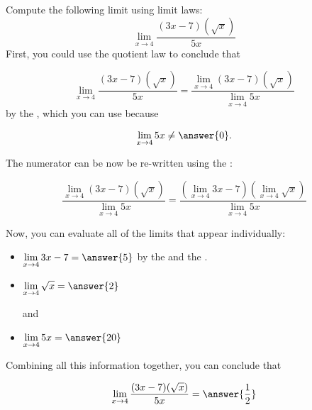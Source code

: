 \documentclass[handout]{ximera}
\begin{document}
\begin{exercise}

Compute the following limit using limit laws:
  \[
  \displaystyle\lim_{x\to 4} \frac{(3x-7)(\sqrt{x})}{5x}  \]
First, you could use the quotient law to conclude that 

\[
  \displaystyle\lim_{x\to 4} \frac{(3x-7)(\sqrt{x})}{5x} = \frac{\displaystyle\lim_{x\to 4} (3x-7)(\sqrt{x})}{\displaystyle\lim_{x\to 4} 5x} \]
by the , which you can use because 

\[
  \displaystyle\lim_{x\to 4} 5x \neq \answer{0}. \]
  
The numerator can be now be re-written using the : 

\[ \frac{\displaystyle\lim_{x\to 4} (3x-7)(\sqrt{x})}{\displaystyle\lim_{x\to 4} 5x} = \frac{\left(\displaystyle\lim_{x\to 4} 3x-7 \right) \left(\displaystyle\lim_{x\to 4}\sqrt{x}\right)}{\displaystyle\lim_{x\to 4} 5x} \]

Now, you can evaluate all of the limits that appear individually: 

\begin{itemize}

\item $\displaystyle\lim_{x\to 4} 3x-7 = \answer{5}$ by the  and the .

\item $\displaystyle\lim_{x\to 4} \sqrt{x} = \answer{2}$

and 

\item $\displaystyle\lim_{x \to 4} 5x = \answer{20}$

\end{itemize}

Combining all this information together, you can conclude that 

\[
  \displaystyle\lim_{x\to 4} \frac{(3x-7)(\sqrt{x})}{5x} = \answer{\frac{1}{2}}  \]

\end{exercise}
\end{document}
